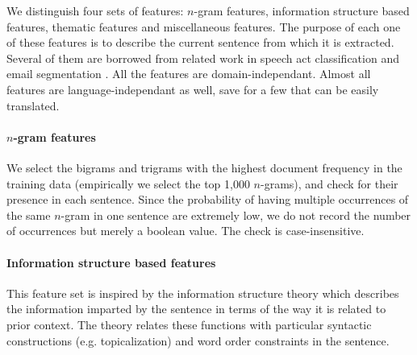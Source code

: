 We distinguish four sets of features:  $n$-gram features, information structure based features, thematic features and miscellaneous features.
The purpose of each one of these features is to describe the current sentence from which it is extracted. 
Several of them are borrowed from related work in speech act classification \cite{qadir2011classifying} and email segmentation \cite{lampert2009segmenting}. All the features are domain-independant. Almost all features are language-independant as well, save for a few that can be easily translated.



\paragraph{$n$-gram features}
%
We select the bigrams and trigrams with the highest document frequency in the training data (empirically we select the top 1,000 $n$-grams), and check for their presence in each sentence. Since the probability of having multiple occurrences of the same $n$-gram in one sentence are extremely low, we do not record the number of occurrences but merely a boolean value. The check is case-insensitive.


\paragraph{Information structure based features}

This feature set is inspired by the information structure theory \cite{kruijff:1996} which 
describes the information imparted by the sentence in terms of the way it is related to prior context. %
 The theory relates these functions with particular syntactic constructions (e.g. topicalization) and word order constraints in the sentence.
%

